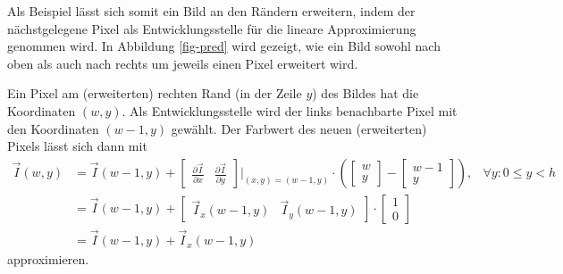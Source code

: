 \documentclass{whswinvcbook}
\begin{document}
Als Beispiel lässt sich somit ein Bild an den Rändern erweitern, indem der nächstgelegene Pixel als Entwicklungsstelle für die lineare Approximierung genommen wird. In Abbildung \ref{fig-pred} wird gezeigt, wie ein Bild sowohl nach oben als auch nach rechts um jeweils einen Pixel erweitert wird.

Ein Pixel am (erweiterten) rechten Rand (in der Zeile $y$) des Bildes hat die Koordinaten $(w,y)$. Als Entwicklungsstelle wird der links benachbarte Pixel mit den Koordinaten $(w-1,y)$ gewählt. Der Farbwert des neuen (erweiterten) Pixels lässt sich dann mit
\begin{align} \label{eq2}
    \vec{I}(w,y) &= \vec{I}(w-1,y) + \begin{bmatrix}
        \frac{\partial \vec{I}}{\partial x} &
        \frac{\partial \vec{I}}{\partial y}
    \end{bmatrix}
    \biggr \rvert_{(x,y)=(w-1,y)} \cdot
    \left( \begin{bmatrix}
        w \\
        y
    \end{bmatrix} - \begin{bmatrix}
        w-1 \\
        y
    \end{bmatrix} \right),&\forall y:0\leq y<h \nonumber \\
    &= \vec{I}(w-1,y) + \begin{bmatrix}
        \vec{I}_x(w-1,y) & \vec{I}_y(w-1,y)
    \end{bmatrix} \cdot \begin{bmatrix}
        1 \\
        0
    \end{bmatrix} \nonumber \\
    &= \vec{I}(w-1,y) + \vec{I}_x(w-1,y)
\end{align}
approximieren.
\end{document}
